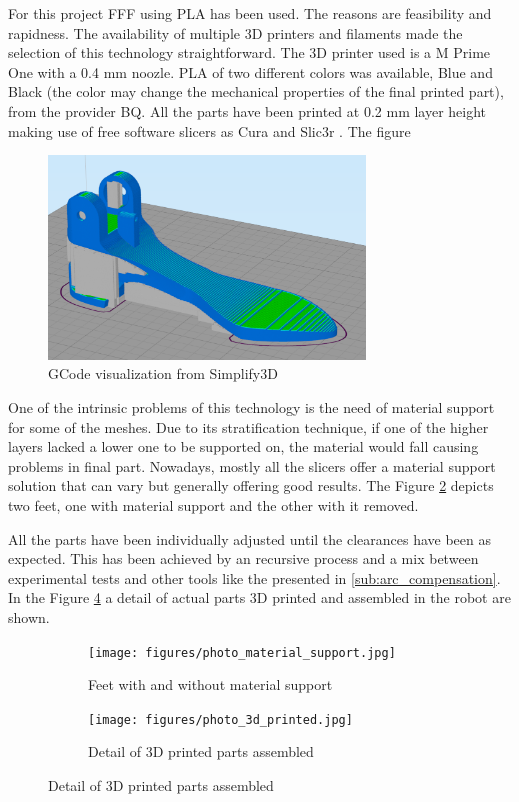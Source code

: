 For this project FFF using PLA has been used.
The reasons are feasibility and rapidness.
The availability of multiple 3D printers and filaments made the selection of this technology straightforward.
The 3D printer used is a M Prime One \cite{m_prime_one} with a 0.4 mm noozle.
PLA of two different colors was available, Blue and Black (the color may change the mechanical properties of the final printed part), from the provider BQ.
All the parts have been printed at 0.2 mm layer height making use of free software slicers as Cura \cite{cura} and Slic3r \cite{slic3r}.
The figure
\begin{figure}[htb]
  \centering
  \includegraphics[width=0.75\textwidth]{figures/3d_printing_gcode}
  \caption{GCode visualization from Simplify3D \cite{simplify3d}}
  \label{fig:3d_printing_gcode}
\end{figure}

One of the intrinsic problems of this technology is the need of material support for some of the meshes.
Due to its stratification technique, if one of the higher layers lacked a lower one to be supported on, the material would fall causing problems in final part.
Nowadays, mostly all the slicers offer a material support solution that can vary but generally offering good results.
The Figure \ref{fig:photo_material_support} depicts two feet, one with material support and the other with it removed.

All the parts have been individually adjusted until the clearances have been as expected.
This has been achieved by an recursive process and a mix between experimental tests and other tools like the presented in \ref{sub:arc_compensation}.
In the Figure \ref{fig:photo_3d_printed} a detail of actual parts 3D printed and assembled in the robot are shown.

\begin{figure}[ht]
    \centering
    \begin{subfigure}[b]{0.49\textwidth}
        \texttt{[image: figures/photo\_material\_support.jpg]}
        \caption{Feet with and without material support}
        \label{fig:photo_material_support}
    \end{subfigure}
    \begin{subfigure}[b]{0.49\textwidth}
        \texttt{[image: figures/photo\_3d\_printed.jpg]}
        \caption{Detail of 3D printed parts assembled}
        \label{fig:photo_3d_printed}
    \end{subfigure}
\end{figure}

